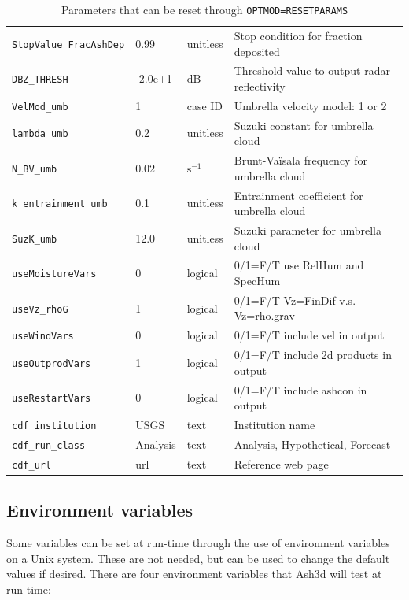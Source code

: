 \begin{table}[htbp]
\begin{center}
\begin{tabular}{| l | l | l | l |}
\texttt{StopValue\_FracAshDep} & 0.99 & unitless           &  Stop condition for fraction deposited \\
\texttt{DBZ\_THRESH}       & -2.0e+1  & $\mathrm{dB}$      &  Threshold value to output radar reflectivity \\
\texttt{VelMod\_umb}       & 1        & case ID            &  Umbrella velocity model: 1 \cite{Costa14} or 2 \cite{Webster20} \\
\texttt{lambda\_umb}       & 0.2      & unitless           &  Suzuki constant for umbrella cloud \\
\texttt{N\_BV\_umb}        & 0.02     & $\mathrm{s^{-1}}$  &  Brunt-Va\"isala frequency for umbrella cloud \\
\texttt{k\_entrainment\_umb} & 0.1    & unitless           &  Entrainment coefficient for umbrella cloud \\
\texttt{SuzK\_umb}         & 12.0     & unitless           &  Suzuki parameter for umbrella cloud \\
\texttt{useMoistureVars}   & 0        & logical            &  0/1=F/T use RelHum and SpecHum \\
\texttt{useVz\_rhoG}       & 1        & logical            &  0/1=F/T Vz=FinDif v.s. Vz=rho.grav \\
\texttt{useWindVars}       & 0        & logical            &  0/1=F/T include vel in output \\
\texttt{useOutprodVars}    & 1        & logical            &  0/1=F/T include 2d products in output \\
\texttt{useRestartVars}    & 0        & logical            &  0/1=F/T include ashcon in output \\
\texttt{cdf\_institution}  & USGS     & text               &  Institution name \\
\texttt{cdf\_run\_class}   & Analysis & text               &  Analysis, Hypothetical, Forecast \\
\texttt{cdf\_url}          & url      & text               &  Reference web page \\
\hline
\end{tabular}
\caption{\label{tab:ResetParam}Parameters that can be reset through \texttt{OPTMOD=RESETPARAMS}}
\end{center}
\end{table}
\normalsize

\subsection{Environment variables}
Some variables can be set at run-time through the use of environment variables on a Unix
system. These are not needed, but can be used to change the default values if desired.
There are four environment variables that Ash3d will test at run-time:


